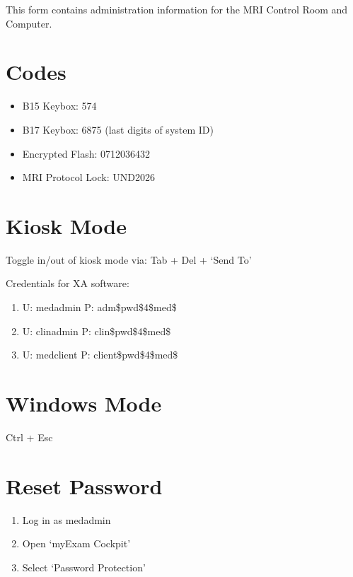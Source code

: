 \documentclass[11pt]{article}
\begin{document}
\renewcommand{\labelenumii}{\arabic{enumi}.\arabic{enumii}}
\renewcommand{\labelenumiii}{\arabic{enumi}.\arabic{enumii}.\arabic{enumiii}}
\renewcommand{\labelenumiv}{\arabic{enumi}.\arabic{enumii}.\arabic{enumiii}.\arabic{enumiv}}

This form contains administration information for the MRI Control Room and Computer.

\section{Codes}

\begin{itemize}
    \item B15 Keybox: 574
    \item B17 Keybox: 6875 (last digits of system ID)
    \item Encrypted Flash: 0712036432
    \item MRI Protocol Lock: UND2026
\end{itemize}


\section{Kiosk Mode}

Toggle in/out of kiosk mode via: Tab + Del + `Send To'

Credentials for XA software:

\begin{enumerate}
    \item U: medadmin P: adm\$pwd\$4\$med\$
    \item U: clinadmin P: clin\$pwd\$4\$med\$
    \item U: medclient P: client\$pwd\$4\$med\$
\end{enumerate}

\section{Windows Mode}

Ctrl + Esc

\section{Reset Password}

\begin{enumerate}
    \item Log in as medadmin
    \item Open `myExam Cockpit'
    \item Select `Password Protection'
\end{enumerate}
\end{document}
